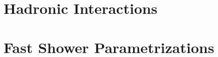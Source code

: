 \documentclass[11pt,twoside]{report}
\begin{document}
\part{Hadronic Interactions}

%





\part{Fast Shower Parametrizations}

 
\end{document}
